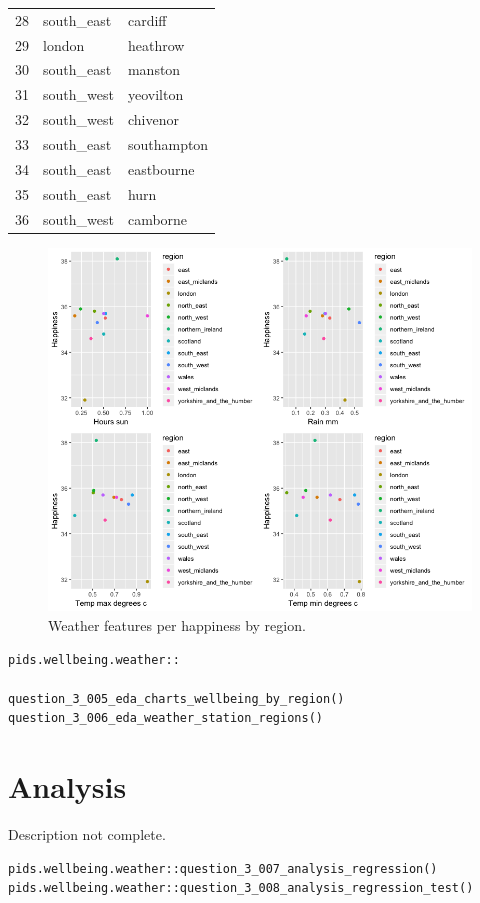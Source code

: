\documentclass[12pt, oneside, openany]{book}
\begin{document}
\begin{table}[ht]
\begin{tabular}{rll}
  28 & south\_east & cardiff \\ 
  29 & london & heathrow \\ 
  30 & south\_east & manston \\ 
  31 & south\_west & yeovilton \\ 
  32 & south\_west & chivenor \\ 
  33 & south\_east & southampton \\ 
  34 & south\_east & eastbourne \\ 
  35 & south\_east & hurn \\ 
  36 & south\_west & camborne \\ 
   \hline
\end{tabular}
\end{table}

\begin{figure}
	\centering
	\captionsetup{justification=centering}
	\includegraphics[scale=0.55]{question_3_005_eda_charts_wellbeing_by_region}
	\caption{Weather features per happiness by region.}
	\label{fig:question_3_005_eda_charts_wellbeing_by_region}
\end{figure}

\bigskip
\begin{lstlisting}
pids.wellbeing.weather::

question_3_005_eda_charts_wellbeing_by_region()
question_3_006_eda_weather_station_regions()
\end{lstlisting}

\section*{Analysis}
\color{red}Description not complete\color{black}.
\bigskip
\begin{lstlisting}
pids.wellbeing.weather::question_3_007_analysis_regression()
pids.wellbeing.weather::question_3_008_analysis_regression_test()
\end{lstlisting}
\end{document}
